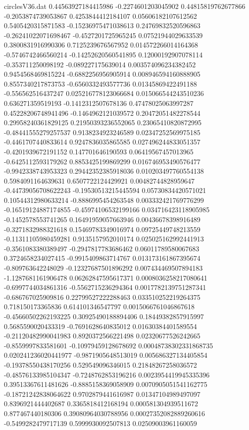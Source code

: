\begin{filecontents}{circlesV36.dat}
0.44563927184415986	-0.2274601203045902	0.44815819762677866
-0.2053874739053867	0.4253844412184107	0.05606182107612562
0.5405420315871583	-0.15236975471038613	0.24769832520596863
-0.26241022071698467	-0.4527201725965245	0.07521944029633539
0.3800831916990306	0.7125239676567952	0.014572266014164368
-0.5746742466560214	-0.14252620560541895	0.12000192907078114
-0.353711250098192	-0.089227175639014	0.003574096234382452
0.9454568469815224	-0.6882256956905914	0.008946594160888905
0.8557340217873753	-0.6560332493577736	0.01345869422491188
-0.556562516437247	0.025216778123066684	0.015066544243510236
0.636271359519193	-0.1412312507678136	0.47478025063997287
0.45228206748941496	-0.1464962121039572	0.20472051482278544
0.29958240361829125	0.21950393236552065	0.23065410820872995
-0.48441555279257537	0.9138234923246589	0.02347252569975185
-0.4461707440833614	0.9247836035865585	0.027496244833051357
-0.4201939672191152	0.147701646190593	0.06419567457013965
-0.6425112593179262	0.8853425199869299	0.016746953490576477
-0.9942338743953323	0.29442352385918036	0.010203497760554138
0.5984091164639631	0.6507722124429921	0.00482744828959647
-0.44739056708622243	-0.19530513215445594	0.05730834420571021
0.10544312980633214	-0.8886995454263548	0.003332421769776299
-0.16519124887174855	-0.45974106532199166	0.034716423118905985
-0.1452578553741265	0.16491959057663946	0.00436678398916489
-0.3271832988321618	0.15469783349016974	0.09725449748213559
-0.11311105980459281	0.9135157952010174	0.025025162992441913
-0.3561083380389497	-0.2947817783686462	0.06011789580067683
0.3724658234027415	-0.9915409863714767	0.013173161867395674
-0.809763642248029	-0.12327687501896292	0.007434469507894183
-1.1287681161906478	0.06262847595617371	0.0008036258217080641
-0.6997744034861316	-0.5562715236294364	0.0017782139751287341
-0.686767025909816	0.22799527222288463	0.033510252219264375
0.718150173365836	0.614101346547797	0.0015066761046867618
-0.45660502262193225	0.30925490188894406	0.18449382857915997
0.5685590020433319	-0.7691628640835012	0.01630384401589554
-0.21120482990041983	0.8920372566221498	0.02320677526242665
-0.8559997833581601	-0.10979459128678692	0.00048738302331868735
0.020241236020441977	-0.9871905648513019	0.005686327134405854
-0.19378550438170256	0.529549096346015	0.21848267258036572
-0.48576133985104347	-0.7248762853196216	0.0023954419945335396
0.39513367611481626	-0.8885158369058909	0.0070905051541162775
-0.18721242838064622	0.9702879441616987	0.01347104989497097
0.8396921444402687	0.3365818412168194	0.000581304939511672
0.877467440180306	0.39080964030788956	0.00027352082889260616
-0.5499282479717139	0.5999930092507813	0.02509003961160059

\end{filecontents}
